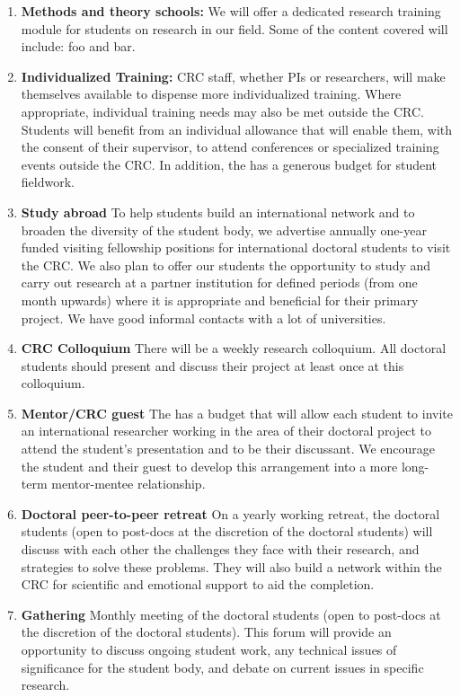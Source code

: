 \begin{enumerate}
\item\textbf{Methods and theory schools:} We will offer a dedicated
  research training module for  students on research in our field.
  Some of the content covered will include: foo and bar.
\item \textbf{Individualized Training:} CRC staff, whether PIs or
  researchers, will make themselves available to dispense more
  individualized training. Where appropriate, individual training
  needs may also be met outside the CRC. Students will benefit from an
  individual allowance that will enable them, with the consent of
  their supervisor, to attend conferences or specialized training
  events outside the CRC. In addition, the  has a generous budget
  for student fieldwork.
\item \textbf{Study abroad} To help students build an international
  network and to broaden the diversity of the student body, we
  advertise annually one-year funded visiting fellowship positions for
  international doctoral students to visit the CRC.  We also plan to
  offer our students the opportunity to study and carry out research
  at a partner institution for defined periods (from one month
  upwards) where it is appropriate and beneficial for their primary
  project. We have good informal contacts with a lot of universities.

\item \textbf{CRC Colloquium} There will be a weekly \thiscrc{}
  research colloquium. All doctoral students should present and discuss their
  project at least once at this colloquium. \item \textbf{Mentor/CRC
    guest} The  has a budget that will allow each student to invite
  an international researcher working in the area of their doctoral project
  to attend the student’s presentation and to be their discussant. We
  encourage the student and their guest to develop this arrangement
  into a more long-term mentor-mentee relationship.
\item \textbf{Doctoral peer-to-peer retreat} On a yearly working
  retreat, the doctoral students (open to post-docs at the discretion
  of the doctoral students) will discuss with each other the
  challenges they face with their research, and strategies to solve
  these problems. They will also build a network within the CRC for
  scientific and emotional support to aid the completion.
\item \textbf{Gathering} Monthly meeting of the doctoral students
  (open to post-docs at the discretion of the doctoral students). This
  forum will provide an opportunity to discuss ongoing student work,
  any technical issues of significance for the  student body,
  and debate on current issues in specific research.
\end{enumerate}





